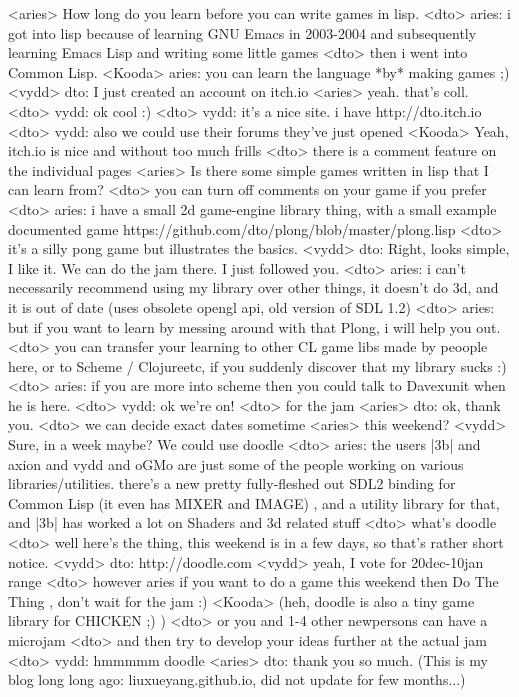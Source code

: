 \documentclass[a4paper,11pt]{article}
\begin{document}
<aries> How long do you learn before you can write games in lisp.
<dto> aries: i got into lisp because of learning GNU Emacs in 2003-2004 and subsequently learning Emacs Lisp and writing some little games
<dto> then i went into Common Lisp.
<Kooda> aries: you can learn the language *by* making games ;)
<vydd> dto: I just created an account on itch.io
<aries> yeah. that's coll.
<dto> vydd: ok cool :)
<dto> vydd: it's a nice site. i have http://dto.itch.io
<dto> vydd: also we could use their forums they've just opened
<Kooda> Yeah, itch.io is nice and without too much frills
<dto> there is a comment feature on the individual pages
<aries> Is there some simple games written in lisp that I can learn from?
<dto> you can turn off comments on your game if you prefer
<dto> aries: i have a small 2d game-engine library thing, with a small example documented game https://github.com/dto/plong/blob/master/plong.lisp
<dto> it's a silly pong game but illustrates the basics.
<vydd> dto: Right, looks simple, I like it. We can do the jam there. I just followed you.
<dto> aries: i can't necessarily recommend using my library over other things, it doesn't do 3d, and it is out of date (uses obsolete opengl api, old version of SDL 1.2)
<dto> aries: but if you want to learn by messing around with that Plong, i will help you out.
<dto> you can transfer your learning to other CL game libs made by peoople here, or to Scheme / Clojureetc, if you suddenly discover that my library sucks :)
<dto> aries: if you are more into scheme then you could talk to Davexunit when he is here.
<dto> vydd: ok we're on!
<dto> for the jam
<aries> dto: ok, thank you.
<dto> we can decide exact dates sometime
<aries> this weekend?
<vydd> Sure, in a week maybe? We could use doodle
<dto> aries: the users |3b| and axion and vydd and oGMo are just some of the people working on various libraries/utilities. there's a new pretty fully-fleshed out SDL2 binding for Common Lisp (it even has MIXER and IMAGE) , and a utility library for that, and |3b| has worked a lot on Shaders and 3d related stuff
<dto> what's doodle
<dto> well here's the thing, this weekend is in a few days, so that's rather short notice.
<vydd> dto: http://doodle.com
<vydd> yeah, I vote for 20dec-10jan range
<dto> however aries if you want to do a game this weekend then Do The Thing , don't wait for the jam :)
<Kooda> (heh, doodle is also a tiny game library for CHICKEN ;) )
<dto> or you and 1-4 other newpersons can have a microjam
<dto> and then try to develop your ideas further at the actual jam
<dto> vydd: hmmmmm doodle
<aries> dto: thank you so much. (This is my blog long long ago: liuxueyang.github.io, did not update for few months...)
\end{document}
